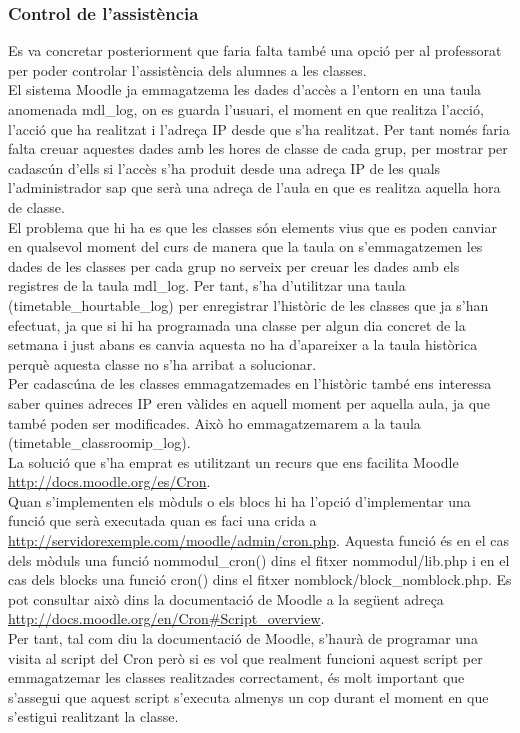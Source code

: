 \documentclass[a4paper]{report}  %
\begin{document}
\subsubsection{Control de l'assistència}
Es va concretar posteriorment que faria falta també una opció per al professorat per poder controlar l'assistència dels alumnes a les classes.\\
El sistema Moodle ja emmagatzema les dades d'accès a l'entorn en una taula anomenada mdl\_log, on es guarda l'usuari, el moment en que realitza l'acció, l'acció que ha realitzat i l'adreça IP desde que s'ha realitzat. Per tant només faria falta creuar aquestes dades amb les hores de classe de cada grup, per mostrar per cadascún d'ells si l'accès s'ha produit desde una adreça IP de les quals l'administrador sap que serà una adreça de l'aula en que es realitza aquella hora de classe.\\
El problema que hi ha es que les classes són elements vius que es poden canviar en qualsevol moment del curs de manera que la taula on s'emmagatzemen les dades de les classes per cada grup no serveix per creuar les dades amb els registres de la taula mdl\_log. Per tant, s'ha d'utilitzar una taula (timetable\_hourtable\_log) per enregistrar l'històric de les classes que ja s'han efectuat, ja que si hi ha programada una classe per algun dia concret de la setmana i just abans es canvia aquesta no ha d'apareixer a la taula històrica perquè aquesta classe no s'ha arribat a solucionar.\\
Per cadascúna de les classes emmagatzemades en l'històric també ens interessa saber quines adreces IP eren vàlides en aquell moment per aquella aula, ja que també poden ser modificades. Això ho emmagatzemarem a la taula (timetable\_classroomip\_log). \\
La solució que s'ha emprat es utilitzant un recurs que ens facilita Moodle \url{http://docs.moodle.org/es/Cron}. \\
Quan s'implementen els mòduls o els blocs hi ha l'opció d'implementar una funció que serà executada quan es faci una crida a \url{http://servidorexemple.com/moodle/admin/cron.php}. Aquesta funció és en el cas dels mòduls una funció nommodul\_cron() dins el fitxer nommodul/lib.php i en el cas dels blocks una funció cron() dins el fitxer nomblock/block\_nomblock.php. Es pot consultar això dins la documentació de Moodle a la següent adreça \url{http://docs.moodle.org/en/Cron#Script_overview}.\\
Per tant, tal com diu la documentació de Moodle, s'haurà de programar una visita al script del Cron però si es vol que realment funcioni aquest script per emmagatzemar les classes realitzades correctament, és molt important que s'assegui que aquest script s'executa almenys un cop durant el moment en que s'estigui realitzant la classe.\\
\end{document}
